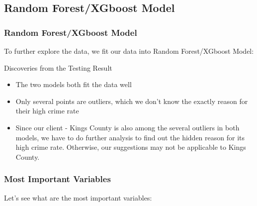 \documentclass{beamer}
\begin{document}
\subsection{Random Forest/XGboost Model}
\begin{frame}[fragile]
\frametitle{Random Forest/XGboost Model}
To further explore the data, we fit our data into Random Forest/XGboost Model:
\begin{center}
\end{center}
\end{frame}




\begin{frame}{Discoveries from the Testing Result}
\begin{itemize}
\item The two models both fit the data well
\item Only several points are outliers, which we don't know the exactly reason for their high crime rate
\item Since our client - Kings County is also among the several outliers in both models, we have to do further analysis to find out the hidden reason for its high crime rate. Otherwise, our suggestions may not be applicable to Kings County.
\end{itemize}

\end{frame}


\begin{frame}[fragile]
\frametitle{Most Important Variables}
Let's see what are the most important variables:
\begin{center}
\end{center}
\end{frame}
\end{document}
